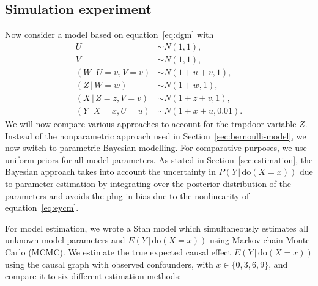 \documentclass{statsoc}
\newcommand{\+}[1]{\ensuremath{\mathbf{#1}}}
\newcommand{\doo}{\textrm{do}}
\newcommand{\given}{{ \, | \, }}
\begin{document}
\subsection{Simulation experiment}
Now consider a model based on equation~\eqref{eq:dgm} with
\begin{equation}
\label{eq:lineargaussian}
\begin{aligned}
U &\sim N(1, 1),\\
V &\sim N(1, 1),\\
(W \given U = u, V = v) &\sim N(1 + u + v, 1),\\
(Z \given W = w) &\sim N(1 + w, 1),\\
(X \given Z = z, V = v) &\sim N(1 + z + v, 1),\\
(Y \given X = x, U = u) &\sim N(1 + x + u, 0.01).
\end{aligned}
\end{equation}
We will now compare various approaches to account for the trapdoor variable $Z$. Instead of the nonparametric approach used in Section~\ref{sec:bernoulli-model}, we now switch to parametric Bayesian modelling. For comparative purposes, we use uniform priors for all model parameters. As stated in Section~\ref{sec:estimation}, the Bayesian approach takes into account the uncertainty in $P(Y\given \doo(X = x))$ due to parameter estimation by integrating over the posterior distribution of the parameters and avoids the plug-in bias due to the nonlinearity of equation~\eqref{eq:eycm}. 

For model estimation, we wrote a Stan model \citep{Stan, rstan} which simultaneously estimates all unknown model parameters and $E(Y \given \doo(X = x))$ using Markov chain Monte Carlo (MCMC). We estimate the true expected causal effect $E(Y \given \doo(X = x))$ using the causal graph with observed confounders, with $x \in \{0, 3, 6, 9\}$, and compare it to six different estimation methods:
\end{document}
